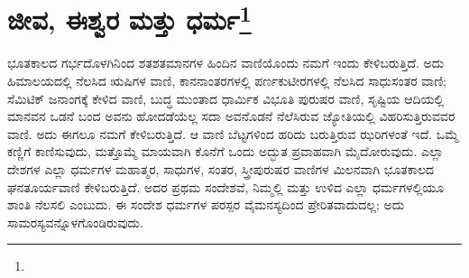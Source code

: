 
\chapter[ಜೀವ, ಈಶ್ವರ ಮತ್ತು ಧರ್ಮ]{ಜೀವ, ಈಶ್ವರ ಮತ್ತು ಧರ್ಮ\protect\footnote{}}

ಭೂತಕಾಲದ ಗರ್ಭದೊಳಗಿನಿಂದ ಶತಶತಮಾನಗಳ ಹಿಂದಿನ ವಾಣಿಯೊಂದು ನಮಗೆ ಇಂದು ಕೇಳಿಬರುತ್ತಿದೆ. ಅದು ಹಿಮಾಲಯದಲ್ಲಿ ನೆಲಸಿದ ಋಷಿಗಳ ವಾಣಿ, ಕಾನನಾಂತರಗಳಲ್ಲಿ ಪರ್ಣಕುಟೀರಗಳಲ್ಲಿ ನೆಲಸಿದ ಸಾಧುಸಂತರ ವಾಣಿ; ಸೆಮಿಟಿಕ್ ಜನಾಂಗಕ್ಕೆ ಕೇಳಿದ ವಾಣಿ, ಬುದ್ಧ ಮುಂತಾದ ಧಾರ್ಮಿಕ ವಿಭೂತಿ ಪುರುಷರ ವಾಣಿ, ಸೃಷ್ಟಿಯ ಆದಿಯಲ್ಲಿ ಮಾನವನ ಒಡನೆ ಬಂದ ಅವನು ಹೋದಡೆಯೆಲ್ಲ ಸದಾ ಅವನೊಡನೆ ನೆಲೆಸಿರುವ ಜ್ಯೋತಿಯಲ್ಲಿ ವಿಹರಿಸುತ್ತಿರುವವರ ವಾಣಿ. ಅದು ಈಗಲೂ ನಮಗೆ ಕೇಳಿಬರುತ್ತಿದೆ. ಆ ವಾಣಿ ಬೆಟ್ಟಗಳಿಂದ ಹರಿದು ಬರುತ್ತಿರುವ ಝರಿಗಳಂತೆ ಇದೆ. ಒಮ್ಮೆ ಕಣ್ಣಿಗೆ ಕಾಣಿಸುವುದು, ಮತ್ತೊಮ್ಮೆ ಮಾಯವಾಗಿ ಕೊನೆಗೆ ಒಂದು ಅದ್ಭುತ ಪ್ರವಾಹವಾಗಿ ಮೈದೋರುವುದು. ಎಲ್ಲಾ ದೇಶಗಳ ಎಲ್ಲಾ ಧರ್ಮಗಳ ಮಹಾತ್ಮರ, ಸಾಧುಗಳ, ಸಂತರ, ಸ್ತ್ರೀಪುರುಷರ ವಾಣಿಗಳ ಮಿಲನವಾಗಿ ಭೂತಕಾಲದ ಘನತೂರ್ಯವಾಣಿ ಕೇಳಿಬರುತ್ತಿದೆ. ಅದರ ಪ್ರಥಮ ಸಂದೇಶವೆ, ನಿಮ್ಮಲ್ಲಿ ಮತ್ತು ಉಳಿದ ಎಲ್ಲಾ ಧರ್ಮಗಳಲ್ಲಿಯೂ ಶಾಂತಿ ನೆಲಸಲಿ ಎಂಬುದು. ಈ ಸಂದೇಶ ಧರ್ಮಗಳ ಪರಸ್ಪರ ವೈಮನಸ್ಯದಿಂದ ಪ್ರೇರಿತವಾದುದಲ್ಲ; ಅದು ಸಾಮರಸ್ಯವನ್ನೊಳಗೊಂಡಿರುವುದು.

